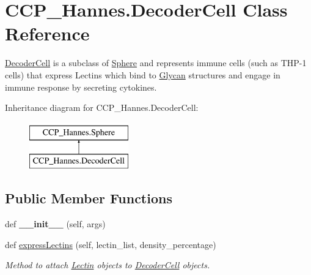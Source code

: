 \hypertarget{class_c_c_p___hannes_1_1_decoder_cell}{}\section{C\+C\+P\+\_\+\+Hannes.\+Decoder\+Cell Class Reference}
\label{class_c_c_p___hannes_1_1_decoder_cell}


\mbox{\hyperlink{class_c_c_p___hannes_1_1_decoder_cell}{Decoder\+Cell}} is a subclass of \mbox{\hyperlink{class_c_c_p___hannes_1_1_sphere}{Sphere}} and represents immune cells (such as T\+H\+P-\/1 cells) that express Lectins which bind to \mbox{\hyperlink{class_c_c_p___hannes_1_1_glycan}{Glycan}} structures and engage in immune response by secreting cytokines.  


Inheritance diagram for C\+C\+P\+\_\+\+Hannes.\+Decoder\+Cell\+:\begin{figure}[H]
\begin{center}
\leavevmode
\includegraphics[height=2.000000cm]{class_c_c_p___hannes_1_1_decoder_cell}
\end{center}
\end{figure}
\subsection*{Public Member Functions}
\begin{DoxyCompactItemize}
\item 
\mbox{\label{class_c_c_p___hannes_1_1_decoder_cell_a3b78453be5d5b389de2f141ad0151feb}} 
def {\bfseries \+\_\+\+\_\+init\+\_\+\+\_\+} (self, args)
\item 
def \mbox{\hyperlink{class_c_c_p___hannes_1_1_decoder_cell_afd9c75a3e3a0b21822db336db465df33}{express\+Lectins}} (self, lectin\+\_\+list, density\+\_\+percentage)
\begin{DoxyCompactList}\small\item\em Method to attach \mbox{\hyperlink{class_c_c_p___hannes_1_1_lectin}{Lectin}} objects to \mbox{\hyperlink{class_c_c_p___hannes_1_1_decoder_cell}{Decoder\+Cell}} objects. \end{DoxyCompactList}\end{DoxyCompactItemize}
